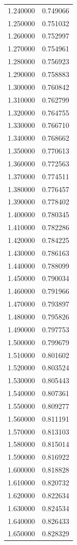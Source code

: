 \begin{tabular}{rr}
1.240000 & 0.749066 \\
1.250000 & 0.751032 \\
1.260000 & 0.752997 \\
1.270000 & 0.754961 \\
1.280000 & 0.756923 \\
1.290000 & 0.758883 \\
1.300000 & 0.760842 \\
1.310000 & 0.762799 \\
1.320000 & 0.764755 \\
1.330000 & 0.766710 \\
1.340000 & 0.768662 \\
1.350000 & 0.770613 \\
1.360000 & 0.772563 \\
1.370000 & 0.774511 \\
1.380000 & 0.776457 \\
1.390000 & 0.778402 \\
1.400000 & 0.780345 \\
1.410000 & 0.782286 \\
1.420000 & 0.784225 \\
1.430000 & 0.786163 \\
1.440000 & 0.788099 \\
1.450000 & 0.790034 \\
1.460000 & 0.791966 \\
1.470000 & 0.793897 \\
1.480000 & 0.795826 \\
1.490000 & 0.797753 \\
1.500000 & 0.799679 \\
1.510000 & 0.801602 \\
1.520000 & 0.803524 \\
1.530000 & 0.805443 \\
1.540000 & 0.807361 \\
1.550000 & 0.809277 \\
1.560000 & 0.811191 \\
1.570000 & 0.813103 \\
1.580000 & 0.815014 \\
1.590000 & 0.816922 \\
1.600000 & 0.818828 \\
1.610000 & 0.820732 \\
1.620000 & 0.822634 \\
1.630000 & 0.824534 \\
1.640000 & 0.826433 \\
1.650000 & 0.828329 \\

\end{tabular}
